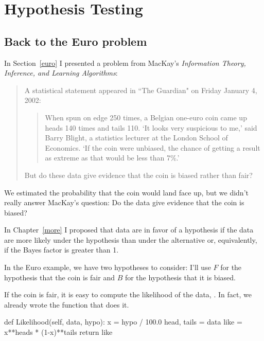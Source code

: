 \documentclass[12pt]{book}
\theoremstyle{exercise}
\begin{document}
\chapter{Hypothesis Testing}
\label{hypotest}

\section{Back to the Euro problem}

In Section~\ref{euro} I presented a problem from MacKay's {\it Information
  Theory, Inference, and Learning Algorithms}:

\begin{quote}
A statistical statement appeared in ``The Guardian" on Friday January 4, 2002:

  \begin{quote}
        When spun on edge 250 times, a Belgian one-euro coin came
        up heads 140 times and tails 110.  `It looks very suspicious
        to me,' said Barry Blight, a statistics lecturer at the London
        School of Economics.  `If the coin were unbiased, the chance of
        getting a result as extreme as that would be less than 7\%.'
        \end{quote}

But do these data give evidence that the coin is biased rather than fair?
\end{quote}

We estimated the probability that the coin would
land face up, but we didn't really answer MacKay's question:
Do the data give evidence that the coin is biased?

In Chapter~\ref{more} I proposed that data are in favor of
a hypothesis if the data are more likely under the hypothesis than
under the alternative or, equivalently, if the Bayes factor is greater
than 1.

In the Euro example, we have two hypotheses to consider: I'll use
$F$ for the hypothesis that the coin is fair and $B$ for the hypothesis
that it is biased.

If the coin is fair, it is easy to compute the likelihood of the
data, .  In fact, we already wrote the function
that does it.

\begin{code}
    def Likelihood(self, data, hypo):
        x = hypo / 100.0
        head, tails = data
        like = x**heads * (1-x)**tails
        return like
\end{code}
\end{document}
